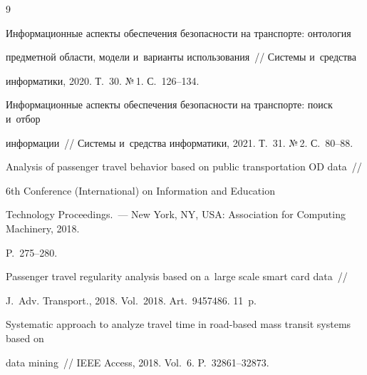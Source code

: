 {\small\frenchspacing


{%




\begin{thebibliography}{9}






Информационные аспекты обеспечения безопас\-ности на транспорте: онтология 


предметной об\-ласти, модели и~варианты использования~/\!\!/ Сис\-те\-мы и~средства 


информатики, 2020. Т.~30. №\,1. С.~126--134.






Информационные аспекты обеспечения безопас\-ности на транспорте: поиск и~отбор 


информации~/\!\!/ Сис\-те\-мы и~средства информатики, 2021. Т.~31. №\,2. С.~80--88.






Analysis of passenger travel behavior based on public transportation OD data~/\!\!/  


6th  Conference (International) on Information and Education 


Technology Proceedings.~--- New York, NY, USA: Association for Computing Machinery, 2018.  


P.~275--280.






Passenger travel regularity analysis based on a~large scale smart card data~/\!\!/  


J.~Adv. Transport., 2018. Vol.~2018. Art.~9457486. 11~p.






Systematic approach to analyze travel time in road-based mass transit systems based on 


data mining~/\!\!/ IEEE Access, 2018. Vol.~6. P.~32861--32873.



\end{thebibliography}}}
